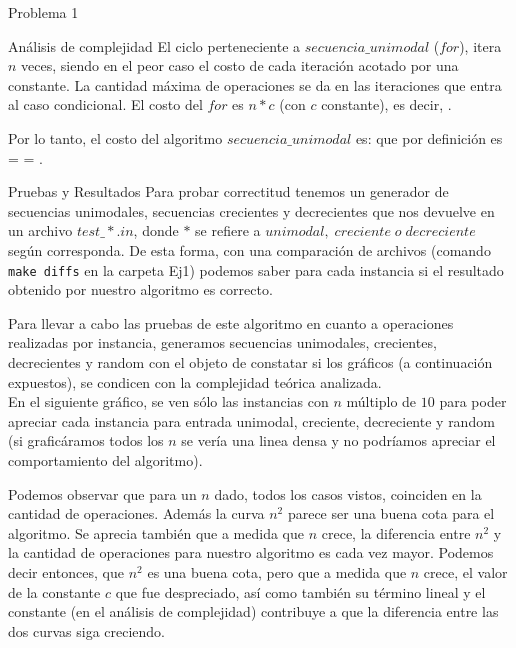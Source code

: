 \begin{section}{Problema 1}
\begin{subsection}{Análisis de complejidad}
		El ciclo perteneciente a $secuencia\_unimodal$ ($for$), itera $n$ veces, siendo en el peor caso el costo de cada iteración acotado por una
		constante. La cantidad máxima de operaciones se da en las iteraciones que entra al caso condicional. El costo del $for$ es $n*c$ (con $c$ constante), es decir, .

		Por lo tanto, el costo del algoritmo $secuencia\_unimodal$ es:  que por definición es 
		 =  = .
		
	\end{subsection}


	\begin{subsection}{Pruebas y Resultados}
		Para probar correctitud tenemos un generador de secuencias unimodales, secuencias crecientes y decrecientes que nos devuelve en un archivo $test\_*.in$, donde $*$ se refiere a $unimodal,\; creciente\; o\; decreciente$ según corresponda. De esta forma, con una comparación de archivos (comando \texttt{make diffs} en la carpeta Ej1) podemos saber para cada instancia si el resultado obtenido por nuestro algoritmo es correcto.

		Para llevar a cabo las pruebas de este algoritmo en cuanto a operaciones realizadas por instancia, generamos secuencias unimodales, crecientes, decrecientes y random con el objeto de constatar si los gráficos (a continuación expuestos), se condicen con la complejidad teórica analizada.\\

		En el siguiente gráfico, se ven sólo las instancias con $n$ múltiplo de $10$ para poder apreciar cada instancia para entrada unimodal, creciente, decreciente y random (si graficáramos todos los $n$ se vería una linea densa y no podríamos apreciar el comportamiento del algoritmo).

		
		Podemos observar que para un $n$ dado, todos los casos vistos, coinciden en la cantidad de operaciones. Además la curva $n^2$ parece ser una buena cota para el algoritmo. Se aprecia también que a medida que $n$ crece, la diferencia entre $n^2$ y la cantidad de operaciones para nuestro algoritmo es cada vez mayor. Podemos decir entonces, que $n^2$ es una buena cota, pero que a medida que $n$ crece, el valor de la constante $c$ que fue despreciado, así como también su término lineal y el constante  (en el análisis de complejidad) contribuye a que la diferencia entre las dos curvas siga creciendo.\\


\end{subsection}
\end{section}
